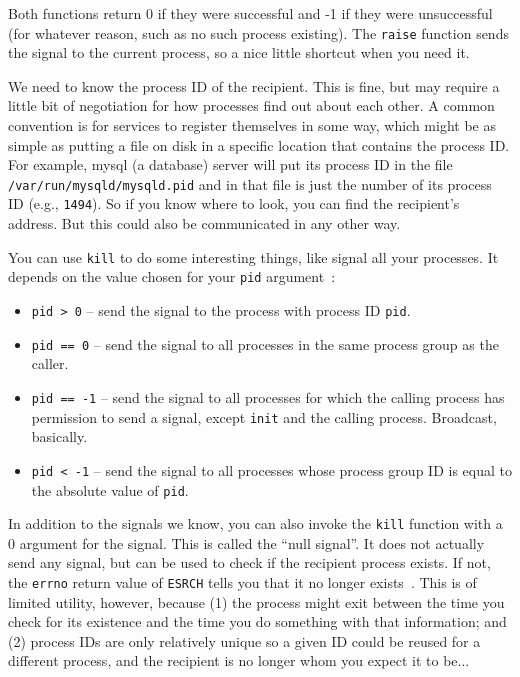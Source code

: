 Both functions return 0 if they were successful and -1 if they were unsuccessful (for whatever reason, such as no such process existing). The \texttt{raise} function sends the signal to the current process, so a nice little shortcut when you need it.

We need to know the process ID of the recipient. This is fine, but may require a little bit of negotiation for how processes find out about each other. A common convention is for services to register themselves in some way, which might be as simple as putting a file on disk in a specific location that contains the process ID. For example, mysql (a database) server will put its process ID in the file \texttt{/var/run/mysqld/mysqld.pid} and in that file is just the number of its process ID (e.g., \texttt{1494}). So if you know where to look, you can find the recipient's address. But this could also be communicated in any other way.

You can use \texttt{kill} to do some interesting things, like signal all your processes. It depends on the value chosen for your \texttt{pid} argument~\cite{apunix}:
\begin{itemize}
	\item \texttt{pid > 0} -- send the signal to the process with process ID \texttt{pid}.
	\item \texttt{pid == 0} -- send the signal to all processes in the same process group as the caller.
	\item \texttt{pid == -1} -- send the signal to all processes for which the calling process has permission to send a signal, except \texttt{init} and the calling process. Broadcast, basically.
	\item \texttt{pid < -1} -- send the signal to all processes whose process group ID is equal to the absolute value of \texttt{pid}.
\end{itemize}

In addition to the signals we know, you can also invoke the \texttt{kill} function with a 0 argument for the signal. This is called the ``null signal''. It does not actually send any signal, but can be used to check if the recipient process exists. If not, the \texttt{errno} return value of \texttt{ESRCH} tells you that it no longer exists~\cite{apunix}. This is of limited utility, however, because (1) the process might exit between the time you check for its existence and the time you do something with that information; and (2) process IDs are only relatively unique so a given ID could be reused for a different process, and the recipient is no longer whom you expect it to be...

